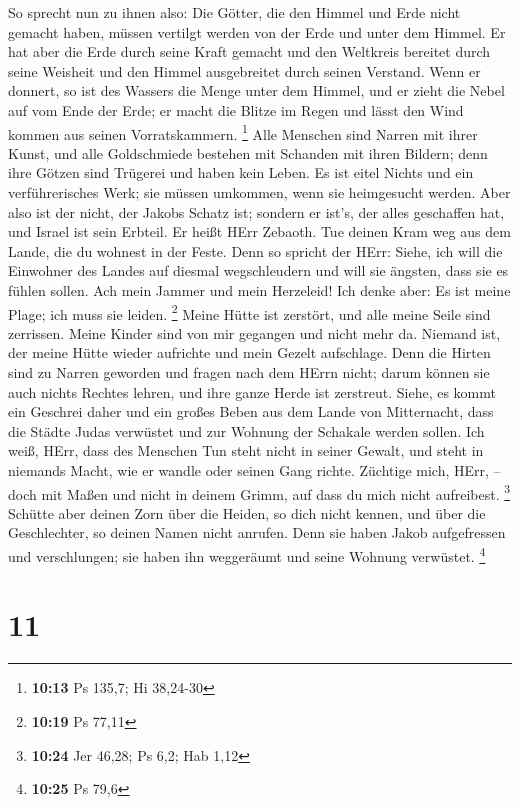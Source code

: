  So sprecht nun zu ihnen also: Die Götter, die den Himmel
und Erde nicht gemacht haben, müssen vertilgt werden von der Erde und
unter dem Himmel.  Er hat aber die Erde durch seine Kraft
gemacht und den Weltkreis bereitet durch seine Weisheit und den Himmel
ausgebreitet durch seinen Verstand.  Wenn er donnert, so
ist des Wassers die Menge unter dem Himmel, und er zieht die Nebel auf
vom Ende der Erde; er macht die Blitze im Regen und lässt den Wind
kommen aus seinen Vorratskammern. \footnote{\textbf{10:13} Ps 135,7; Hi
  38,24-30}  Alle Menschen sind Narren mit ihrer Kunst, und
alle Goldschmiede bestehen mit Schanden mit ihren Bildern; denn ihre
Götzen sind Trügerei und haben kein Leben.  Es ist eitel
Nichts und ein verführerisches Werk; sie müssen umkommen, wenn sie
heimgesucht werden.  Aber also ist der nicht, der Jakobs
Schatz ist; sondern er ist's, der alles geschaffen hat, und Israel ist
sein Erbteil. Er heißt HErr Zebaoth.  Tue deinen Kram weg
aus dem Lande, die du wohnest in der Feste.  Denn so
spricht der HErr: Siehe, ich will die Einwohner des Landes auf diesmal
wegschleudern und will sie ängsten, dass sie es fühlen sollen.
 Ach mein Jammer und mein Herzeleid! Ich denke aber: Es ist
meine Plage; ich muss sie leiden. \footnote{\textbf{10:19} Ps 77,11}
 Meine Hütte ist zerstört, und alle meine Seile sind
zerrissen. Meine Kinder sind von mir gegangen und nicht mehr da. Niemand
ist, der meine Hütte wieder aufrichte und mein Gezelt aufschlage.
 Denn die Hirten sind zu Narren geworden und fragen nach
dem HErrn nicht; darum können sie auch nichts Rechtes lehren, und ihre
ganze Herde ist zerstreut.  Siehe, es kommt ein Geschrei
daher und ein großes Beben aus dem Lande von Mitternacht, dass die
Städte Judas verwüstet und zur Wohnung der Schakale werden sollen.
 Ich weiß, HErr, dass des Menschen Tun steht nicht in
seiner Gewalt, und steht in niemands Macht, wie er wandle oder seinen
Gang richte.  Züchtige mich, HErr, -- doch mit Maßen und
nicht in deinem Grimm, auf dass du mich nicht aufreibest. \footnote{\textbf{10:24}
  Jer 46,28; Ps 6,2; Hab 1,12}  Schütte aber deinen Zorn
über die Heiden, so dich nicht kennen, und über die Geschlechter, so
deinen Namen nicht anrufen. Denn sie haben Jakob aufgefressen und
verschlungen; sie haben ihn weggeräumt und seine Wohnung verwüstet.
\footnote{\textbf{10:25} Ps 79,6}

\hypertarget{section-4}{%
\section{11}\label{section-4}}

